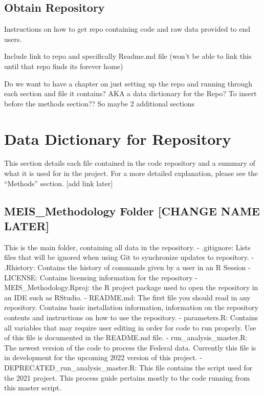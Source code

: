 \documentclass[
]{book}
\begin{document}
\hypertarget{obtain-repository}{%
\section{Obtain Repository}\label{obtain-repository}}

Instructions on how to get repo containing code and raw data provided to end users.

Include link to repo and specifically Readme.md file (won't be able to link this until that repo finds its forever home)

Do we want to have a chapter on just setting up the repo and running through each section and file it contains? AKA a data dictionary for the Repo? To insert before the methods section??
So maybe 2 additional sections

\hypertarget{data-dictionary-for-repository}{%
\chapter{Data Dictionary for Repository}\label{data-dictionary-for-repository}}

This section details each file contained in the code repository and a summary of what it is used for in the project. For a more detailed explanation, please see the ``Methods'' section. {[}add link later{]}

\hypertarget{meis_methodology-folder-change-name-later}{%
\section{MEIS\_Methodology Folder {[}CHANGE NAME LATER{]}}\label{meis_methodology-folder-change-name-later}}

This is the main folder, containing all data in the repository.
- .gitignore: Lists files that will be ignored when using Git to synchronize updates to repository.
- .Rhistory: Contains the history of commands given by a user in an R Session
- LICENSE: Contains licensing information for the repository
- MEIS\_Methodology.Rproj: the R project package used to open the repository in an IDE such as RStudio.
- README.md: The first file you should read in any repository. Contains basic installation information, information on the repository contents and instructions on how to use the repository.
- parameters.R: Contains all variables that may require user editing in order for code to run properly. Use of this file is documented in the README.md file.
- run\_analysis\_master.R: The newest version of the code to process the Federal data. Currently this file is in development for the upcoming 2022 version of this project.
- DEPRECATED\_run\_analysis\_master.R: This file contains the script used for the 2021 project. This process guide pertains mostly to the code running from this master script.
\end{document}
